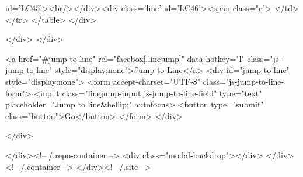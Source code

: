 id='LC45'><br/></div><div class='line' id='LC46'><span class="c">%
            </td>
          </tr>
        </table>
  </div>

  </div>
</div>

<a href="#jump-to-line" rel="facebox[.linejump]" data-hotkey="l" class="js-jump-to-line" style="display:none">Jump to Line</a>
<div id="jump-to-line" style="display:none">
  <form accept-charset="UTF-8" class="js-jump-to-line-form">
    <input class="linejump-input js-jump-to-line-field" type="text" placeholder="Jump to line&hellip;" autofocus>
    <button type="submit" class="button">Go</button>
  </form>
</div>

        </div>

      </div><!-- /.repo-container -->
      <div class="modal-backdrop"></div>
    </div><!-- /.container -->
  </div><!-- /.site -->


